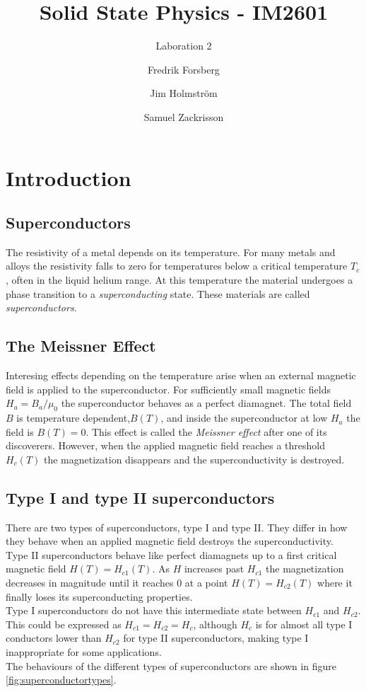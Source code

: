 \documentclass[a4paper,twoside=false,abstract=false,numbers=noenddot,
titlepage=false,headings=small,parskip=half,version=last]{scrartcl}
\title{Solid State Physics - IM2601}
\subtitle{Laboration 2}
\author[1]{Fredrik Forsberg}
\author[1]{Jim Holmström}
\author[1]{Samuel Zackrisson}
\affil[1]{Engineering Physics, Royal Institute of Technology}
\affil[1]{\{fforsber, jimho, samuelz\}@kth.se}
\begin{document}
\maketitle
\thispagestyle{empty}

\section{Introduction}
\subsection{Superconductors}
The resistivity of a metal depends on its temperature. 
For many metals and alloys the resistivity falls to zero for temperatures below a critical temperature $T_c$, often in the liquid helium range.
At this temperature the material undergoes a phase transition to a \emph{superconducting} state.
These materials are called \emph{superconductors}.

\subsection{The Meissner Effect}
Interesing effects depending on the temperature arise when an external magnetic field is applied to the superconductor. For sufficiently small magnetic fields $H_a=B_a / \mu_0$ the superconductor behaves as a perfect diamagnet. The total field $B$ is temperature dependent,$B(T)$, and inside the superconductor at low $H_a$ the field is $B(T)=0$. This effect is called the \emph{Meissner effect} after one of its discoverers. However, when the applied magnetic field reaches a threshold $H_c(T)$ the magnetization disappears and the superconductivity is destroyed.
\subsection{Type I and type II superconductors}
There are two types of superconductors, type I and type II.
They differ in how they behave when an applied magnetic field destroys the superconductivity.\\
Type II superconductors behave like perfect diamagnets up to a first critical magnetic field $H(T)=H_{c1}(T)$.
As $H$ increases past $H_{c1}$ the magnetization decreases in magnitude until it reaches 0 at a point $H(T)=H_{c2}(T)$ where it finally loses its superconducting properties.\\
Type I superconductors do not have this intermediate state between $H_{c1}$ and $H_{c2}$.
This could be expressed as $H_{c1}=H_{c2}=H_c$, although $H_c$ is for almost all type I conductors lower than $H_{c2}$ for type II superconductors, making type I inappropriate for some applications.\\
The behaviours of the different types of superconductors are shown in figure \ref{fig:superconductortypes}.
\end{document}

